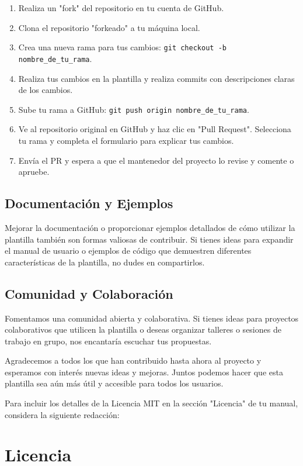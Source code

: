 \documentclass[11pt]{article}
\begin{document}
\begin{enumerate}
\item Realiza un "fork" del repositorio en tu cuenta de GitHub.
\item Clona el repositorio "forkeado" a tu máquina local.
\item Crea una nueva rama para tus cambios: \texttt{git checkout -b nombre\_de\_tu\_rama}.
\item Realiza tus cambios en la plantilla y realiza commits con descripciones claras de los cambios.
\item Sube tu rama a GitHub: \texttt{git push origin nombre\_de\_tu\_rama}.
\item Ve al repositorio original en GitHub y haz clic en "Pull Request". Selecciona tu rama y completa el formulario para explicar tus cambios.
\item Envía el PR y espera a que el mantenedor del proyecto lo revise y comente o apruebe.
\end{enumerate}

\subsection{Documentación y Ejemplos}

Mejorar la documentación o proporcionar ejemplos detallados de cómo utilizar la plantilla también son formas valiosas de contribuir. Si tienes ideas para expandir el manual de usuario o ejemplos de código que demuestren diferentes características de la plantilla, no dudes en compartirlos.

\subsection{Comunidad y Colaboración}

Fomentamos una comunidad abierta y colaborativa. Si tienes ideas para proyectos colaborativos que utilicen la plantilla o deseas organizar talleres o sesiones de trabajo en grupo, nos encantaría escuchar tus propuestas.

Agradecemos a todos los que han contribuido hasta ahora al proyecto y esperamos con interés nuevas ideas y mejoras. Juntos podemos hacer que esta plantilla sea aún más útil y accesible para todos los usuarios.


Para incluir los detalles de la Licencia MIT en la sección "Licencia" de tu manual, considera la siguiente redacción:

\section{Licencia}
\end{document}
